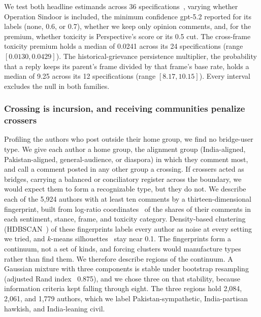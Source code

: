 We test both headline estimands across 36 specifications~\cite{simonsohn2020specification}, varying whether Operation Sindoor is included, the minimum confidence gpt-5.2 reported for its labels (none, 0.6, or 0.7), whether we keep only opinion comments, and, for the premium, whether toxicity is Perspective's score or its 0.5 cut. The cross-frame toxicity premium holds a median of 0.0241 across its 24 specifications (range $[0.0130, 0.0429]$). The historical-grievance persistence multiplier, the probability that a reply keeps its parent's frame divided by that frame's base rate, holds a median of 9.25 across its 12 specifications (range $[8.17, 10.15]$). Every interval excludes the null in both families.


\subsubsection{Crossing is incursion, and receiving communities penalize crossers}
\label{sec:results-crossing}

Profiling the authors who post outside their home group, we find no bridge-user type. We give each author a home group, the alignment group (India-aligned, Pakistan-aligned, general-audience, or diaspora) in which they comment most, and call a comment posted in any other group a crossing. If crossers acted as bridges, carrying a balanced or conciliatory register across the boundary, we would expect them to form a recognizable type, but they do not. We describe each of the 5,924 authors with at least ten comments by a thirteen-dimensional fingerprint, built from log-ratio coordinates~\cite{aitchison1982compositional,egozcue2003ilr} of the shares of their comments in each sentiment, stance, frame, and toxicity category. Density-based clustering (HDBSCAN~\cite{campello2013hdbscan}) of these fingerprints labels every author as noise at every setting we tried, and $k$-means silhouettes~\cite{rousseeuw1987silhouettes} stay near 0.1. The fingerprints form a continuum, not a set of kinds, and forcing clusters would manufacture types rather than find them. We therefore describe regions of the continuum. A Gaussian mixture with three components is stable under bootstrap resampling (adjusted Rand index~\cite{hubert1985comparing} 0.875), and we chose three on that stability, because information criteria kept falling through eight. The three regions hold 2,084, 2,061, and 1,779 authors, which we label Pakistan-sympathetic, India-partisan hawkish, and India-leaning civil.

